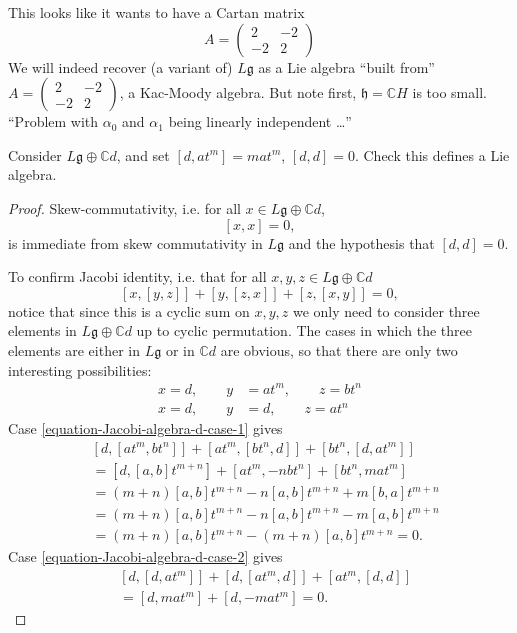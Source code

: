 This looks like it wants to have a Cartan matrix
 $$
A=\begin{pmatrix}
2&-2\\ 
-2&2
\end{pmatrix}
$$
We will indeed recover (a variant of) $L\mathfrak{g}$ as a Lie algebra 
``built from'' $A=\begin{pmatrix}
2&-2\\ 
-2&2
\end{pmatrix}$,
 a Kac-Moody algebra. 
But note first, $\mathfrak{h}=\mathbb{C}H$ is too small.
``Problem with $\alpha_0$ and $\alpha_1$ being linearly independent  …''

\begin{exercise}
\label{exercise-Lie-algebra-d}
Consider $L\mathfrak{g}\oplus\mathbb{C}d$, and set 
$[d,at^m]=mat^m$, $[d,d]=0$. Check this defines a Lie algebra.
\end{exercise}

\begin{proof}
Skew-commutativity, i.e. for all $x \in L\mathfrak{g}\oplus\mathbb{C}d$,
\begin{equation}
\label{equation-skew-commutativity}
[x,x]=0,
\end{equation}
is immediate from 
skew commutativity in $L\mathfrak{g}$ and 
the hypothesis that $[d,d]=0$.

To confirm Jacobi identity, i.e. that for all 
$x,y,z \in L\mathfrak{g}\oplus\mathbb{C}d$
\begin{equation}
\label{equation-Jacobi-algebra-d-identity}
[x,[y,z]]+[y,[z,x]]+[z,[x,y]]=0,
\end{equation}
notice that since this is a cyclic sum on $x,y,z$ 
we only need to consider three elements in
$L\mathfrak{g} \oplus \mathbb{C}d$ up to cyclic permutation.
The cases in which the three elements are either in $L\mathfrak{g}$ or in
$\mathbb{C}d$ are obvious, so that there
are only two interesting possibilities:
\begin{align}
x=d,\qquad y&=at^m,\qquad z=bt^n
\label{equation-Jacobi-algebra-d-case-1}\\
x=d,\qquad y&=d,\qquad z=at^n
\label{equation-Jacobi-algebra-d-case-2}
\end{align}
Case \ref{equation-Jacobi-algebra-d-case-1} gives
\begin{align*}
& [d,[at^m,bt^n]]+[at^m,[bt^n,d]]+[bt^n,[d,at^m]]\\
&=[d,[a,b]t^{m+n}]+[at^m,-nbt^n]+[bt^n,mat^m]\\
&=(m+n)[a,b]t^{m+n}-n[a,b]t^{m+n}+m[b,a]t^{m+n}\\
&=(m+n)[a,b]t^{m+n}-n[a,b]t^{m+n}-m[a,b]t^{m+n}\\
&=(m+n)[a,b]t^{m+n}-(m+n)[a,b]t^{m+n}=0.
\end{align*}
Case \ref{equation-Jacobi-algebra-d-case-2} gives
\begin{align*}
&[d,[d,at^m]]+[d,[at^m,d]]+[at^m,[d,d]]\\
&=[d,mat^m]+[d,-mat^m]=0.
\end{align*}

\end{proof}

